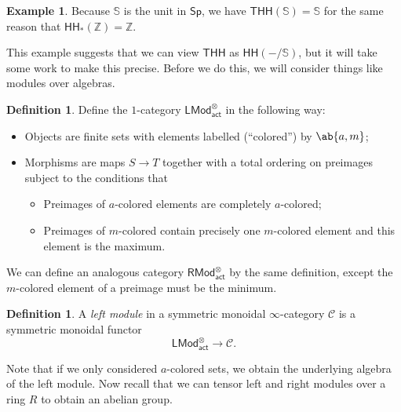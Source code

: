\documentclass[10pt, oneside]{memoir}
\theoremstyle{definition}
\newtheorem{defn}[thm]{Definition}
\newtheorem{exm}[thm]{Example}
\theoremstyle{remark}
\theoremstyle{plain}
\theoremstyle{definition}
\theoremstyle{remark}
\newcommand{\Z}{\mathbb{Z}}
\newcommand{\bS}{\mathbb{S}}
\newcommand{\mc}[1]{\mathcal{#1}}
\newcommand{\ms}[1]{\mathsf{#1}}
\newcommand{\1}{\mathbf{1}}
\newcommand{\2}{\mathbf{2}}
\newcommand{\3}{\mathbf{3}}
\newcommand{\THH}{\ms{THH}}
\newcommand{\HH}{\ms{HH}}
\begin{document}
\begin{exm}
    Because $\bS$ is the unit in $\ms{Sp}$, we have $\THH(\bS) = \bS$ for the same reason that $\HH_*(\Z) = \Z$.
\end{exm}
This example suggests that we can view $\THH$ as $\HH(-/\bS)$, but it will take some work to make this precise. Before we do this, we will consider things like modules over algebras.

\begin{defn}
    Define the $1$-category $\ms{LMod}_{\ms{act}}^{\otimes}$ in the following way:
    \begin{itemize}
        \item Objects are finite sets with elements labelled (``colored'') by $\ab\{a, m\}$;
        \item Morphisms are maps $S \to T$ together with a total ordering on preimages subject to the conditions that
        \begin{itemize}
            \item Preimages of $a$-colored elements are completely $a$-colored;
            \item Preimages of $m$-colored contain precisely one $m$-colored element and this element is the maximum.
        \end{itemize}
    \end{itemize}
    We can define an analogous category $\ms{RMod}^{\otimes}_{\ms{act}}$ by the same definition, except the $m$-colored element of a preimage must be the minimum.
\end{defn}

\begin{defn}
    A \textit{left module} in a symmetric monoidal $\infty$-category $\mc{C}$ is a symmetric monoidal functor
    \[ \ms{LMod}_{\ms{act}}^{\otimes} \to \mc{C}. \]
\end{defn}

Note that if we only considered $a$-colored sets, we obtain the underlying algebra of the left module. Now recall that we can tensor left and right modules over a ring $R$ to obtain an abelian group.
\end{document}
